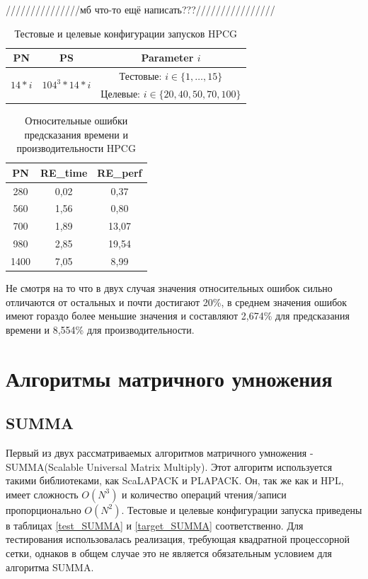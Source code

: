 	///////////////мб что-то ещё написать???////////////////

	\begin{table}
		\begin{tabular}{|c|c|c|}
			\hline
			PN                          & PS                                 & Parameter \(i\)                            \\ \hline
			\multirow{2}{*}{\(14 * i\)} & \multirow{2}{*}{\(104^3 * 14 *i\)} & Тестовые: \(i \in \{1, \ldots, 15\}\)      \\ \cline{3-3}
			                            &                                    & Целевые: \(i \in \{20, 40, 50, 70, 100\}\) \\ \hline
		\end{tabular}
		\caption{Тестовые и целевые конфигурации запусков HPCG}
		\label{conf_HPCG}
	\end{table}


	\begin{table}
		\begin{tabular}{|c|c|c|}
			\hline
			PN   & RE\_time & RE\_perf \\ \hline
			280	 & 0,02     & 0,37     \\ \hline
			560	 & 1,56     & 0,80     \\ \hline
			700	 & 1,89     & 13,07    \\ \hline
			980	 & 2,85     & 19,54    \\ \hline
			1400 & 7,05     & 8,99     \\ \hline
		\end{tabular}
		\caption{Относительные ошибки предсказания времени и производительности HPCG}
		\label{result_HPCG}
	\end{table}

	Не смотря на то что в двух случая значения относительных ошибок сильно отличаются от остальных и почти достигают 20\%, в среднем значения ошибок имеют гораздо более меньшие значения и составляют 2,674\% для предсказания времени и 8,554\% для производительности.

	\section{Алгоритмы матричного умножения}
		\subsection{SUMMA}
			Первый из двух рассматриваемых алгоритмов матричного умножения - SUMMA(Scalable Universal Matrix Multiply)\cite{SUMMA}. Этот алгоритм используется такими библиотеками, как ScaLAPACK и PLAPACK. Он, так же как и HPL, имеет сложность \(O(N^3)\) и количество операций чтения/записи пропорционально \(O(N^2)\). Тестовые и целевые конфигурации запуска приведены в таблицах \ref{test_SUMMA} и \ref{target_SUMMA} соответственно. Для тестирования использовалась реализация, требующая квадратной процессорной сетки, однаков в общем случае это не является обязательным условием для алгоритма SUMMA.

